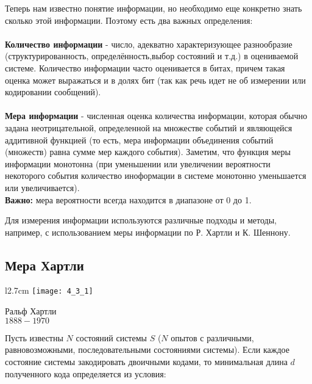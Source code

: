 Теперь нам известно понятие информации, но необходимо еще конкретно знать сколько этой информации. Поэтому есть два важных определения:
\\
\\\textbf{Количество информации} - число, адекватно характеризующее разнообразие (структурированность, определённость,выбор состояний и т.д.) в оцениваемой системе. Количество информации часто оценивается в битах, причем такая оценка может выражаться и в долях бит (так как речь идет не об измерении или кодировании сообщений).
\\
\\\textbf{Мера информации} - численная оценка количества информации, которая обычно задана неотрицательной, определенной на множестве событий и являющейся аддитивной функцией (то есть, мера информации объединения событий (множеств) равна сумме мер каждого события). Заметим, что функция меры информации монотонна (при уменьшении или увеличении вероятности некоторого события количество иноформации в системе монотонно уменьшается или увеличивается). 
\\\textbf{Важно:} мера вероятности всегда находится в диапазоне от 0 до 1.
\par
Для измерения информации используются различные подходы и методы, например, с использованием меры информации по Р. Хартли и К. Шеннону.

\newpage
\subsection{Мера Хартли}

\begin{wrapfigure}{l}{2.7cm}
\texttt{[image: 4\_3\_1]}
\begin{center}
\footnotesize{Ральф Хартли}
\\\footnotesize{$1888 - 1970$}
\end{center}
\end{wrapfigure}

Пусть известны $N$ состояний системы $S$ ($N$  опытов с различными, равновозможными, последовательными состояниями системы). Если каждое состояние системы закодировать двоичными кодами, то минимальная длина $d$ полученного кода определяется из условия:

